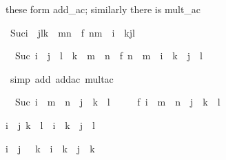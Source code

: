 \begin{isabellebody}
\begin{isamarkuptext}
these form add_ac; similarly there is mult_ac%
\end{isamarkuptext}%
\ {\isachardoublequote}Suc{\isacharparenleft}i\ {\isacharplus}\ j{\isacharasterisk}l{\isacharasterisk}k\ {\isacharplus}\ m{\isacharasterisk}n{\isacharparenright}\ {\isacharequal}\ f\ {\isacharparenleft}n{\isacharasterisk}m\ {\isacharplus}\ i\ {\isacharplus}\ k{\isacharasterisk}j{\isacharasterisk}l{\isacharparenright}{\isachardoublequote}%
\begin{isamarkuptxt}%
\begin{isabelle}%
\ {}{\isachardot}\ Suc\ {\isacharparenleft}i\ {\isacharplus}\ j\ {\isacharasterisk}\ l\ {\isacharasterisk}\ k\ {\isacharplus}\ m\ {\isacharasterisk}\ n{\isacharparenright}\ {\isacharequal}\ f\ {\isacharparenleft}n\ {\isacharasterisk}\ m\ {\isacharplus}\ i\ {\isacharplus}\ k\ {\isacharasterisk}\ j\ {\isacharasterisk}\ l{\isacharparenright}%
\end{isabelle}%
\end{isamarkuptxt}%
\ {\isacharparenleft}simp\ add{\isacharcolon}\ add{\isacharunderscore}ac\ mult{\isacharunderscore}ac{\isacharparenright}%
\begin{isamarkuptxt}%
\begin{isabelle}%
\ {}{\isachardot}\ Suc\ {\isacharparenleft}i\ {\isacharplus}\ {\isacharparenleft}m\ {\isacharasterisk}\ n\ {\isacharplus}\ j\ {\isacharasterisk}\ {\isacharparenleft}k\ {\isacharasterisk}\ l{\isacharparenright}{\isacharparenright}{\isacharparenright}\ {\isacharequal}\isanewline
\ \ \ \ f\ {\isacharparenleft}i\ {\isacharplus}\ {\isacharparenleft}m\ {\isacharasterisk}\ n\ {\isacharplus}\ j\ {\isacharasterisk}\ {\isacharparenleft}k\ {\isacharasterisk}\ l{\isacharparenright}{\isacharparenright}{\isacharparenright}%
\end{isabelle}%
\end{isamarkuptxt}%
%
\begin{isamarkuptext}%
\begin{isabelle}%
{\isasymlbrakk}i\ {\isasymle}\ j{\isacharsemicolon}\ k\ {\isasymle}\ l{\isasymrbrakk}\ {\isasymLongrightarrow}\ i\ {\isacharasterisk}\ k\ {\isasymle}\ j\ {\isacharasterisk}\ l%
\end{isabelle}

\begin{isabelle}%
{\isasymlbrakk}i\ {\isacharless}\ j{\isacharsemicolon}\ {}\ {\isacharless}\ k{\isasymrbrakk}\ {\isasymLongrightarrow}\ i\ {\isacharasterisk}\ k\ {\isacharless}\ j\ {\isacharasterisk}\ k%
\end{isabelle}


\end{isamarkuptext}
\end{isabellebody}
